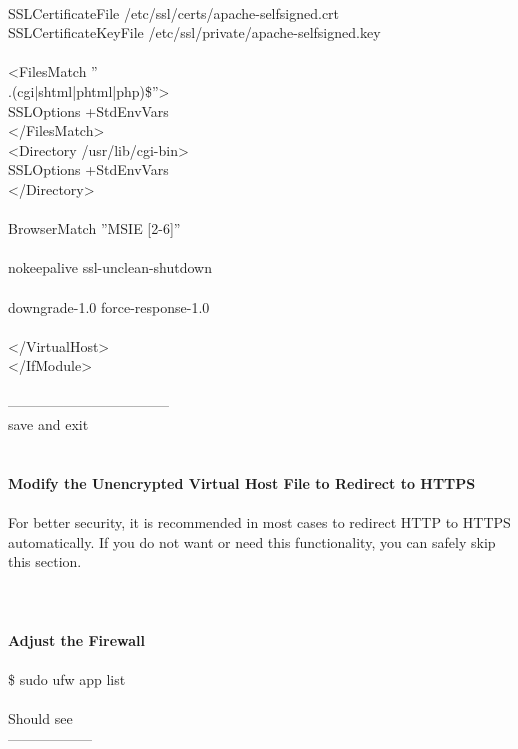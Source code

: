 \documentclass[10pt,a4paper]{article}
\begin{document}
{{{{{{{{{{{{{{{{{{\\
                SSLCertificateFile      /etc/ssl/certs/apache-selfsigned.crt}{\large \\
                SSLCertificateKeyFile /etc/ssl/private/apache-selfsigned.key}{\large \\
\\
                <FilesMatch ''\\.(cgi|shtml|phtml|php)\$''>\\
                                SSLOptions +StdEnvVars\\
                </FilesMatch>\\
                <Directory /usr/lib/cgi-bin>}{\large \\
                                SSLOptions +StdEnvVars\\
                </Directory>\\
\\
                BrowserMatch ''MSIE [2-6]'' \\\\
                               nokeepalive ssl-unclean-shutdown \\\\
                               downgrade-1.0 force-response-1.0\\
\\
        </VirtualHost>\\
</IfModule>\\
\\
-----------------------------------\\
save and exit\\
\\
\\
\textbf{Modify the Unencrypted Virtual Host File to Redirect to HTTPS}}{\large \\
\\
For better security, it is recommended in most cases to redirect HTTP to HTTPS automatically. If you do not want or need this functionality, you can safely skip this section.\\
\\
[I'll skip]\\
\\
\textbf{Adjust the Firewall}}{\large \\
\\
\$ sudo ufw app list\\
\\
Should see\\
------------------\\
}}}}}}}}}}}}}}}}}}
\end{document}

